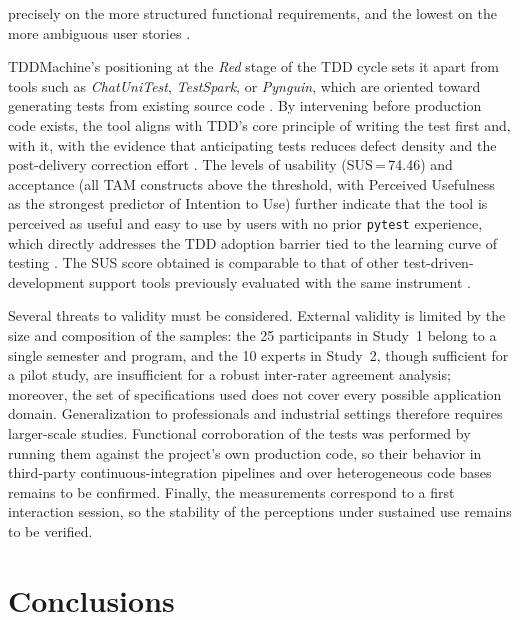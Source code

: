\documentclass[10pt,journal,twoside,letterpaper]{IEEEtran}
\begin{document}
precisely on the more structured functional requirements, and the lowest on the more ambiguous user stories \cite{wang2024survey,yang2024evaluation}.
    
    TDDMachine's positioning at the \emph{Red} stage of the TDD cycle sets it apart from tools such as \emph{ChatUniTest}, \emph{TestSpark}, or \emph{Pynguin}, which are oriented toward generating tests from existing source code \cite{chen2024chatunitest,sapozhnikov2024testspark,lukasczyk2022pynguin}. By intervening before production code exists, the tool aligns with TDD's core principle of writing the test first and, with it, with the evidence that anticipating tests reduces defect density and the post-delivery correction effort \cite{nagappan2008tdd,rafique2013meta,erdogmus2005testfirst}. The levels of usability (SUS\,=\,74.46) and acceptance (all TAM constructs above the threshold, with Perceived Usefulness as the strongest predictor of Intention to Use) further indicate that the tool is perceived as useful and easy to use by users with no prior \texttt{pytest} experience, which directly addresses the TDD adoption barrier tied to the learning curve of testing \cite{ghafari2020inconclusive,bangor2009sus,davis1989tam}. The SUS score obtained is comparable to that of other test-driven-development support tools previously evaluated with the same instrument \cite{guerrero2025tddtool}.
    
    Several threats to validity must be considered. External validity is limited by the size and composition of the samples: the 25 participants in Study~1 belong to a single semester and program, and the 10 experts in Study~2, though sufficient for a pilot study, are insufficient for a robust inter-rater agreement analysis; moreover, the set of specifications used does not cover every possible application domain. Generalization to professionals and industrial settings therefore requires larger-scale studies. Functional corroboration of the tests was performed by running them against the project's own production code, so their behavior in third-party continuous-integration pipelines and over heterogeneous code bases remains to be confirmed. Finally, the measurements correspond to a first interaction session, so the stability of the perceptions under sustained use remains to be verified.
    
    \section{Conclusions}
    \label{sec:conclusiones}
    
\end{document}
